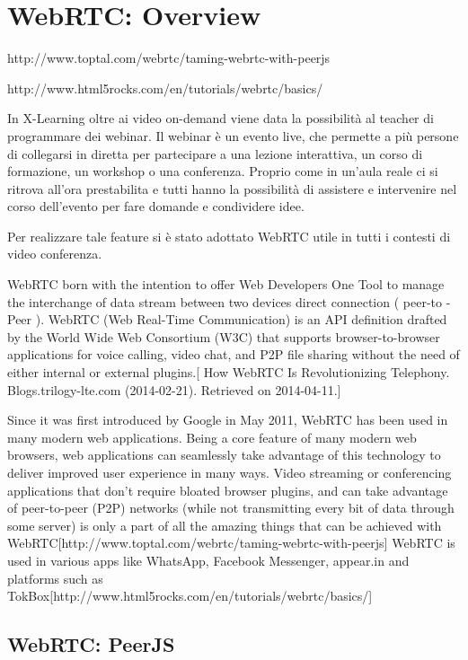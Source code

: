 \newpage
\section{WebRTC: Overview}
\label{sec:WebRTC: Overview}


http://www.toptal.com/webrtc/taming-webrtc-with-peerjs

http://www.html5rocks.com/en/tutorials/webrtc/basics/

In X-Learning oltre ai video on-demand viene data la possibilità al teacher di programmare dei webinar.
Il webinar è un evento live, che permette a più persone di collegarsi in diretta per partecipare a una lezione interattiva, un corso di formazione, un workshop o una conferenza. Proprio come in un’aula reale ci si ritrova all’ora prestabilita e tutti hanno la possibilità di assistere e intervenire nel corso dell’evento per fare domande e condividere idee.

Per realizzare tale feature si è stato adottato WebRTC utile in tutti i contesti di video conferenza.

WebRTC born with the intention to offer Web Developers One Tool to manage the interchange of data stream between two devices direct connection ( peer-to -Peer ).
WebRTC (Web Real-Time Communication) is an API definition drafted by the World Wide Web Consortium (W3C) that supports browser-to-browser applications for voice calling, video chat, and P2P file sharing without the need of either internal or external plugins.[ How WebRTC Is Revolutionizing Telephony. Blogs.trilogy-lte.com (2014-02-21). Retrieved on 2014-04-11.]

Since it was first introduced by Google in May 2011, WebRTC has been used in many modern web applications. Being a core feature of many modern web browsers, web applications can seamlessly take advantage of this technology to deliver improved user experience in many ways. Video streaming or conferencing applications that don’t require bloated browser plugins, and can take advantage of peer-to-peer (P2P) networks (while not transmitting every bit of data through some server) is only a part of all the amazing things that can be achieved with WebRTC[http://www.toptal.com/webrtc/taming-webrtc-with-peerjs]
WebRTC is used in various apps like WhatsApp, Facebook Messenger, appear.in and platforms such as TokBox[http://www.html5rocks.com/en/tutorials/webrtc/basics/]

\subsection{WebRTC: PeerJS}
\label{sec:WebRTC: PeerJS}

